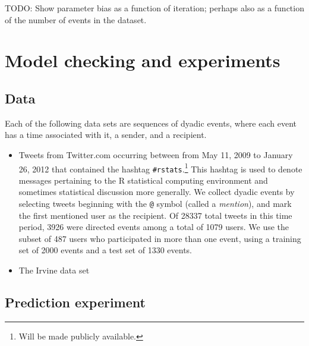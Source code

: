 \documentclass[11pt]{article}
\begin{document}
TODO: Show parameter bias as a function of iteration; perhaps also as a function of the number of events in the dataset.

\section{Model checking and experiments}

\subsection*{Data}

Each of the following data sets are sequences of dyadic events, where each event has a time associated with it, a sender, and a recipient.

\begin{itemize}
\item Tweets from Twitter.com occurring between from May 11, 2009 to January 26, 2012 that contained the hashtag \texttt{\#rstats}.\footnote{Will be made publicly available.}  This hashtag is used to denote messages pertaining to the R statistical computing environment and sometimes statistical discussion more generally.  We collect dyadic events by selecting tweets beginning with the \texttt{@} symbol (called a \emph{mention}), and mark the first mentioned user as the recipient.  Of 28337 total tweets in this time period, 3926 were directed events among a total of 1079 users.  We use the subset of 487 users who participated in more than one event, using a training set of 2000 events and a test set of 1330 events.
\item The Irvine data set
\end{itemize}

\subsection*{Prediction experiment}
\end{document}
